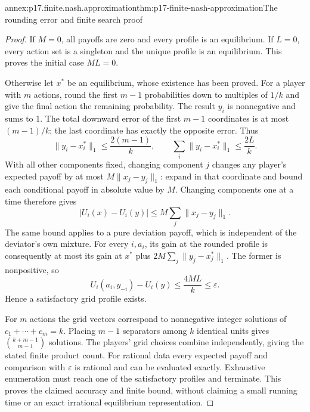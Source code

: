 \begin{annexitem}{annex:p17.finite.nash.approximation}{thm:p17-finite-nash-approximation}{The rounding error and finite search proof}
\begin{proof}
If \(M=0\), all payoffs are zero
and every profile is an equilibrium.
If \(L=0\), every action set is
a singleton and the unique profile
is an equilibrium. This proves
the initial case \(ML=0\).

Otherwise let \(x^*\) be an equilibrium,
whose existence has been proved.
For a player with \(m\) actions,
round the first \(m-1\) probabilities
down to multiples of \(1/k\)
and give the final action the
remaining probability. The result
\(y_i\) is nonnegative and sums to 1.
The total downward error of the
first \(m-1\) coordinates is at
most \((m-1)/k\); the last
coordinate has exactly the opposite
error. Thus
\[
                  \|y_i-x_i^*\|_1\leq\frac{2(m-1)}{k},
 \qquad
                  \sum_i\|y_i-x_i^*\|_1\leq\frac{2L}{k}.
\]
With all other components fixed,
changing component \(j\) changes
any player's expected payoff by
at most \(M\|x_j-y_j\|_1\):
expand in that coordinate and
bound each conditional payoff
in absolute value by \(M\).
Changing components one at a time
therefore gives
\[
                    |U_i(x)-U_i(y)|
                         \leq M\sum_j\|x_j-y_j\|_1.
\]
The same bound applies to a pure
deviation payoff, which is independent
of the deviator's own mixture.
For every \(i,a_i\), its gain at
the rounded profile is consequently
at most its gain at \(x^*\)
plus \(2M\sum_j\|y_j-x_j^*\|_1\).
The former is nonpositive, so
\[
                U_i(a_i,y_{-i})-U_i(y)
                      \leq\frac{4ML}{k}\leq\varepsilon.
\]
Hence a satisfactory grid profile
exists.

For \(m\) actions the grid vectors
correspond to nonnegative integer
solutions of \(c_1+\cdots+c_m=k\).
Placing \(m-1\) separators among
\(k\) identical units gives
\({k+m-1\choose m-1}\) solutions.
The players' grid choices combine
independently, giving the stated
finite product count.
For rational data every expected
payoff and comparison with
\(\varepsilon\) is rational and
can be evaluated exactly.
Exhaustive enumeration must reach
one of the satisfactory profiles
and terminate. This proves the
claimed accuracy and finite bound,
without claiming a small running
time or an exact irrational
equilibrium representation.
\end{proof}
\end{annexitem}
